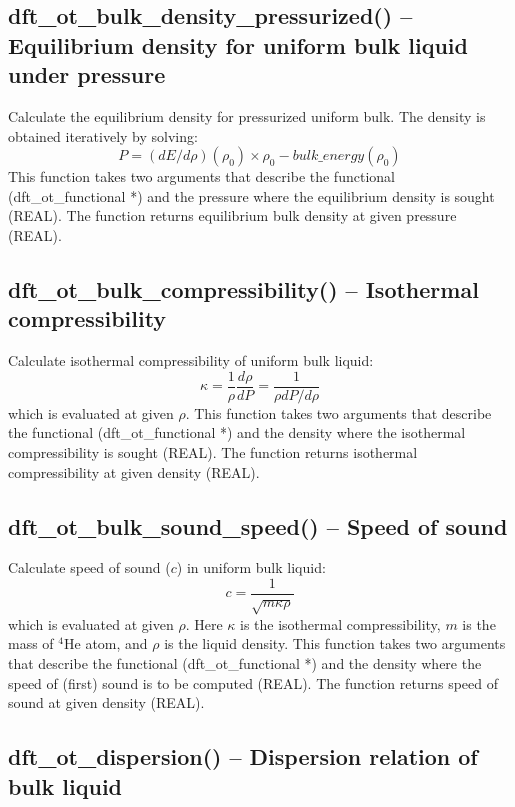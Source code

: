 \documentclass[12pt,letterpaper]{report}
\begin{document}
\subsection{dft\_ot\_bulk\_density\_pressurized() -- Equilibrium density for uniform bulk liquid under pressure}

Calculate the equilibrium density for pressurized uniform bulk. The density is obtained iteratively by solving:
$$P = (dE/d\rho)(\rho_0)\times\rho_0 - bulk\_energy(\rho_0)$$
This function takes two arguments that describe the functional (dft\_ot\_functional *) and the pressure where the equilibrium density is sought (REAL). The function returns equilibrium bulk density at given pressure (REAL).

\subsection{dft\_ot\_bulk\_compressibility() -- Isothermal compressibility}

Calculate isothermal compressibility of uniform bulk liquid:
$$\kappa = \frac{1}{\rho} \frac{d\rho}{dP} = \frac{1}{\rho dP/d\rho}$$
which is evaluated at given $\rho$. This function takes two arguments that describe the functional (dft\_ot\_functional *) and the density where the isothermal compressibility is sought (REAL). The function returns isothermal compressibility at given density (REAL).

\subsection{dft\_ot\_bulk\_sound\_speed() -- Speed of sound}

Calculate speed of sound ($c$) in uniform bulk liquid:
$$ c = \frac{1}{\sqrt{m \kappa \rho}}$$
which is evaluated at given $\rho$. Here $\kappa$ is the isothermal compressibility, $m$ is the mass of $^4$He atom, and $\rho$ is the liquid density. This function takes two arguments that describe the functional (dft\_ot\_functional *) and the density where the speed of (first) sound is to be computed (REAL). The function returns speed of sound at given density (REAL).

\subsection{dft\_ot\_dispersion() -- Dispersion relation of bulk liquid}
\end{document}
